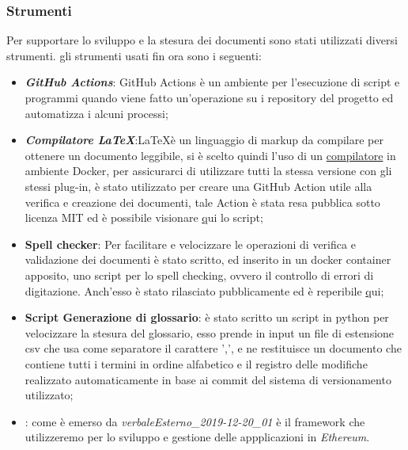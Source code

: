 \subsubsection{Strumenti}
Per supportare lo sviluppo e la stesura dei documenti sono stati utilizzati diversi
strumenti.
gli strumenti usati fin ora sono i seguenti:
\begin{itemize}
  \item \textbf{\textit{GitHub Actions\glos}}:
  GitHub Actions è un ambiente per l'esecuzione di script e programmi quando viene
  fatto un'operazione su i repository del progetto ed automatizza i alcuni processi;
  \item \textbf{\textit{Compilatore \LaTeX\glos}}:\LaTeX \space è un linguaggio
  di markup da compilare per ottenere un documento leggibile, si è scelto quindi l'uso di un
  \href{https://GitHub.com/dante-ev/docker-texlive}{compilatore} in ambiente Docker\glos,
  per assicurarci di utilizzare tutti la stessa versione con gli stessi plug-in,
  è stato utilizzato per creare una GitHub Action utile
  alla verifica e creazione dei documenti, tale Action è stata resa pubblica sotto licenza MIT
  ed è possibile visionare \href{https://GitHub.com/Jatus93/Latex-multicompiler}qui lo script;
  \item \textbf{Spell checker}:
  Per facilitare e velocizzare le operazioni di verifica e validazione dei documenti è
  stato scritto, ed inserito in un docker container apposito, uno script per lo
  spell checking, ovvero il controllo di errori di digitazione.
  Anch'esso è stato rilasciato pubblicamente ed è reperibile \href{https://GitHub.com/Jatus93/spellCheck}qui;

  \item \textbf{Script Generazione di glossario}: è stato scritto un script in python per velocizzare la stesura
  del glossario, esso prende in input un file di estensione csv che usa come
  separatore il carattere ',', e ne restituisce un documento che contiene tutti i
  termini in ordine alfabetico e il registro delle modifiche realizzato automaticamente
  in base ai commit del sistema di versionamento utilizzato;

  \item \textbf{}: come è emerso da \textit{verbaleEsterno\_2019-12-20\_01} è il framework che
  utilizzeremo per lo sviluppo e gestione delle appplicazioni in \textit{Ethereum\glos}.
\end{itemize}
